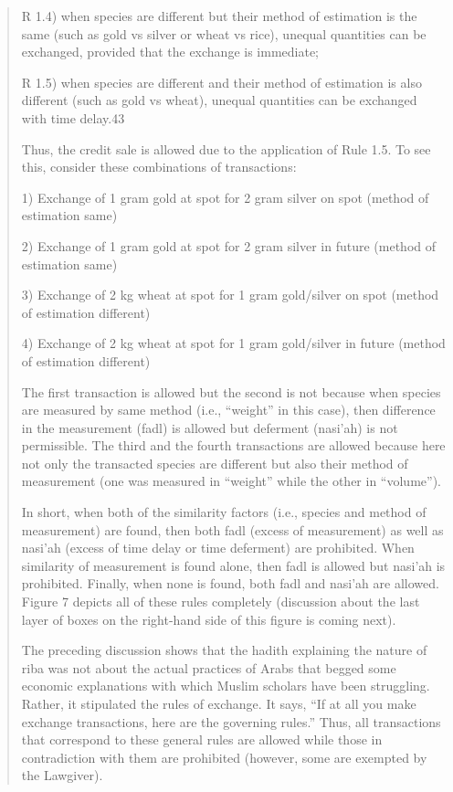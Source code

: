 \begin{quote}
R 1.4) when species are different but their method of estimation is the same (such as gold vs silver or wheat vs rice), unequal quantities can be exchanged, provided that the exchange is immediate;

R 1.5) when species are different and their method of estimation is also different (such as gold vs wheat), unequal quantities can be exchanged with time delay.43

Thus, the credit sale is allowed due to the application of Rule 1.5. To see this, consider these combinations of transactions:

1) Exchange of 1 gram gold at spot for 2 gram silver on spot (method of estimation same)

2) Exchange of 1 gram gold at spot for 2 gram silver in future (method of estimation same)

3) Exchange of 2 kg wheat at spot for 1 gram gold/silver on spot (method of estimation different)

4) Exchange of 2 kg wheat at spot for 1 gram gold/silver in future (method of estimation different)

The first transaction is allowed but the second is not because when species are measured by same method (i.e., “weight” in this case), then difference in the measurement (fadl) is allowed but deferment (nasi'ah) is not permissible. The third and the fourth transactions are allowed because here not only the transacted species are different but also their method of measurement (one was measured in “weight” while the other in “volume”).

In short, when both of the similarity factors (i.e., species and method of measurement) are found, then both fadl (excess of measurement) as well as nasi'ah (excess of time delay or time deferment) are prohibited. When similarity of measurement is found alone, then fadl is allowed but nasi'ah is prohibited. Finally, when none is found, both fadl and nasi'ah are allowed. Figure 7 depicts all of these rules completely (discussion about the last layer of boxes on the right-hand side of this figure is coming next).

The preceding discussion shows that the hadith explaining the nature of riba was not about the actual practices of Arabs that begged some economic explanations with which Muslim scholars have been struggling. Rather, it stipulated the rules of exchange. It says, “If at all you make exchange transactions, here are the governing rules.” Thus, all transactions that correspond to these general rules are allowed while those in contradiction with them are prohibited (however, some are exempted by the Lawgiver).


\end{quote}
